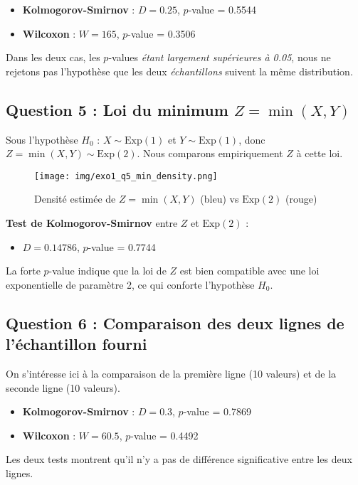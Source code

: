 \documentclass[a4paper,11pt]{article}
\begin{document}
\begin{itemize}
\item \textbf{Kolmogorov-Smirnov} : $D = 0.25$, $p$-value = 0.5544
\item \textbf{Wilcoxon} : $W = 165$, $p$-value = 0.3506
\end{itemize}

Dans les deux cas, les $p$-values \textit{étant largement supérieures à 0.05}, nous ne rejetons pas l'hypothèse que les deux \textit{échantillons} suivent la même distribution.

\subsection*{Question 5 : Loi du minimum $Z = \min(X, Y)$}

Sous l'hypothèse $H_0$ : $X \sim \text{Exp}(1)$ et $Y \sim \text{Exp}(1)$, donc $Z = \min(X, Y) \sim \text{Exp}(2)$. Nous comparons empiriquement $Z$ à cette loi.

\begin{figure}[h!]
\centering
\texttt{[image: img/exo1\_q5\_min\_density.png]}
\caption{Densité estimée de $Z = \min(X, Y)$ (bleu) vs $\text{Exp}(2)$ (rouge)}
\end{figure}

\noindent
\textbf{Test de Kolmogorov-Smirnov} entre $Z$ et $\text{Exp}(2)$ :
\begin{itemize}
\item $D = 0.14786$, $p$-value = 0.7744
\end{itemize}

La forte $p$-value indique que la loi de $Z$ est bien compatible avec une loi exponentielle de paramètre 2, ce qui conforte l'hypothèse $H_0$.

\subsection*{Question 6 : Comparaison des deux lignes de l'échantillon fourni}

On s'intéresse ici à la comparaison de la première ligne (10 valeurs) et de la seconde ligne (10 valeurs).

\begin{itemize}
\item \textbf{Kolmogorov-Smirnov} : $D = 0.3$, $p$-value = 0.7869
\item \textbf{Wilcoxon} : $W = 60.5$, $p$-value = 0.4492
\end{itemize}

Les deux tests montrent qu'il n'y a pas de différence significative entre les deux lignes.
\end{document}
